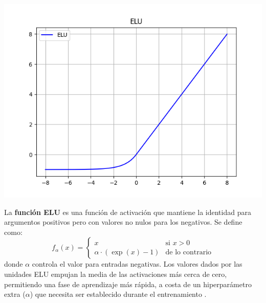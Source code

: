 \begin{minipage}{0.35\textwidth}
    \includegraphics[width=1.1\textwidth]{img/elu.png}
    \label{img:elu}
\end{minipage}
\begin{minipage}{0.05\textwidth}
\textbf{ }
\end{minipage}
\begin{minipage}{0.6\textwidth}
    La \textbf{función ELU} es una función de activación que mantiene la identidad para argumentos positivos pero con valores no nulos para los negativos. Se define como:
    \[
    f_{\alpha}(x) =
    \begin{cases} 
    x & \text{si } x > 0 \\
    \alpha \cdot (\exp(x) - 1) & \text{de lo contrario}
    \end{cases}
    \]
    donde \( \alpha \) controla el valor para entradas negativas. Los valores dados por las unidades ELU empujan la media de las activaciones más cerca de cero, permitiendo una fase de aprendizaje más rápida, a costa de un hiperparámetro extra (\( \alpha \)) que necesita ser establecido durante el entrenamiento \citep{apicella2021survey}.
\end{minipage}

